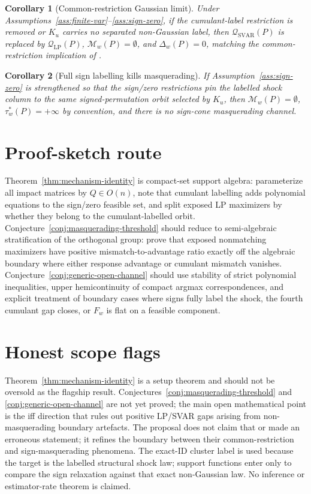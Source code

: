 \documentclass[11pt]{article}
\theoremstyle{definition}
\theoremstyle{plain}
\newtheorem{corollary}{Corollary}
\theoremstyle{remark}
\begin{document}
\begin{corollary}[Common-restriction Gaussian limit]\label{cor:gaussian-common}
Under Assumptions~\ref{ass:finite-var}--\ref{ass:sign-zero}, if the cumulant-label restriction is removed or \(K_u\) carries no separated non-Gaussian label, then \(\mathcal Q_{\mathrm{SVAR}}(P)\) is replaced by \(\mathcal Q_{\mathrm{LP}}(P)\), \(\mathcal M_w(P)=\emptyset\), and \(\Delta_w(P)=0\), matching the common-restriction implication of \citet{PlagborgMollerWolf2021}.
\end{corollary}

\begin{corollary}[Full sign labelling kills masquerading]\label{cor:full-sign}
If Assumption~\ref{ass:sign-zero} is strengthened so that the sign/zero restrictions pin the labelled shock column to the same signed-permutation orbit selected by \(K_u\), then \(\mathcal M_w(P)=\emptyset\), \(\tau_w^*(P)=+\infty\) by convention, and there is no sign-cone masquerading channel.
\end{corollary}

\section{Proof-sketch route}
Theorem~\ref{thm:mechanism-identity} is compact-set support algebra: parameterize all impact matrices by \(Q\in O(n)\), note that cumulant labelling adds polynomial equations to the sign/zero feasible set, and split exposed LP maximizers by whether they belong to the cumulant-labelled orbit.  Conjecture~\ref{conj:masquerading-threshold} should reduce to semi-algebraic stratification of the orthogonal group: prove that exposed nonmatching maximizers have positive mismatch-to-advantage ratio exactly off the algebraic boundary where either response advantage or cumulant mismatch vanishes.  Conjecture~\ref{conj:generic-open-channel} should use stability of strict polynomial inequalities, upper hemicontinuity of compact argmax correspondences, and explicit treatment of boundary cases where signs fully label the shock, the fourth cumulant gap closes, or \(F_w\) is flat on a feasible component.

\section{Honest scope flags}
Theorem~\ref{thm:mechanism-identity} is a setup theorem and should not be oversold as the flagship result.  Conjectures~\ref{conj:masquerading-threshold} and \ref{conj:generic-open-channel} are not yet proved; the main open mathematical point is the iff direction that rules out positive LP/SVAR gaps arising from non-masquerading boundary artefacts.  The proposal does not claim that \citet{PlagborgMollerWolf2021} or \citet{Wolf2022} made an erroneous statement; it refines the boundary between their common-restriction and sign-masquerading phenomena.  The exact-ID cluster label is used because the target is the labelled structural shock law; support functions enter only to compare the sign relaxation against that exact non-Gaussian law.  No inference or estimator-rate theorem is claimed.
\end{document}
